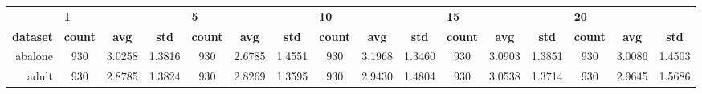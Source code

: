 \begin{table}[htbp]
{\begin{tabular}{rccccccccccccccc}
			\cmidrule{2-3}                      & \multicolumn{1}{l}{\textbf{1}}      &                                                                           &                 & \multicolumn{1}{l}{\textbf{5}} &                                                                                    &                 & \multicolumn{1}{l}{\textbf{10}} &                                                                           &                 & \multicolumn{1}{l}{\textbf{15}} &                                                                           &                 & \multicolumn{1}{l}{\textbf{20}} &                 &                 \\
			\cmidrule{2-16}    \textbf{dataset} & \textbf{count}                      & \textbf{avg}                                                              & \textbf{std}    & \textbf{count}                 & \textbf{avg}                                                                       & \textbf{std}    & \textbf{count}                  & \textbf{avg}                                                              & \textbf{std}    & \textbf{count}                  & \textbf{avg}                                                              & \textbf{std}    & \textbf{count}                  & \textbf{avg}    & \textbf{std}    \\
			\midrule
			abalone                             & 930                                 & 3.0258                                                                    & 1.3816          & 930                            & \cellcolor[rgb]{ .776,  .937,  .808}\textcolor[rgb]{ 0,  .38,  0}{2.6785}          & 1.4551          & 930                             & 3.1968                                                                    & 1.3460          & 930                             & 3.0903                                                                    & 1.3851          & 930                             & 3.0086          & 1.4503          \\
			adult                               & 930                                 & 2.8785                                                                    & 1.3824          & 930                            & \cellcolor[rgb]{ .776,  .937,  .808}\textcolor[rgb]{ 0,  .38,  0}{2.8269}          & 1.3595          & 930                             & 2.9430                                                                    & 1.4804          & 930                             & 3.0538                                                                    & 1.3714          & 930                             & 2.9645          & 1.5686          \\

\end{tabular}}
\end{table}
